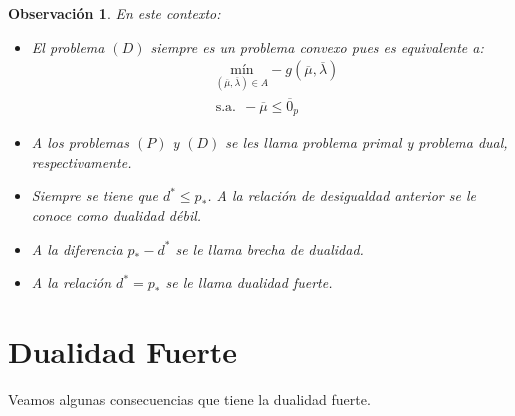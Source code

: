 \documentclass[11pt]{report}
\newtheorem{observation}{Observación}[section]
\newcommand{\mv}{\overline{\mu}}
\newcommand{\lv}{\overline{\lambda}}
\newcommand{\zp}{\overline{0}_{p}}
\newcommand{\po}{p_{*}}
\newcommand{\deo}{d^{*}}
\begin{document}
\begin{observation}
En este contexto:
\begin{itemize}
\item[(i)] El problema $(D)$ siempre es un problema convexo pues es equivalente a:
\begin{equation*}
\begin{aligned}
& \underset{(\mv,\lv)\in A}{\text{mín}} -g(\mv,\lv) \\
& \text{s.a.}\ \ -\mv\leq\zp
\end{aligned}
\end{equation*}
\item[(ii)] A los problemas $(P)$ y $(D)$ se les llama \emph{problema primal} y \emph{problema dual}, respectivamente.
\item[(iii)] Siempre se tiene que $\deo\leq\po$. A la relación de desigualdad anterior se le conoce como \emph{dualidad débil}.
\item[(iv)] A la diferencia $\po - \deo$ se le llama \emph{brecha de dualidad}.
\item[(v)] A la relación $\deo=\po$ se le llama \emph{dualidad fuerte}.

\end{itemize}
\end{observation}

\section{Dualidad Fuerte}
\noindent
Veamos algunas consecuencias que tiene la dualidad fuerte.
\end{document}

